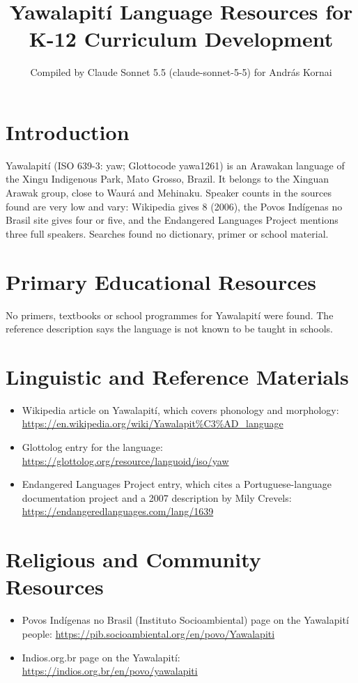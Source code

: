\documentclass[12pt]{article}
\title{Yawalapit\'i Language Resources for K-12 Curriculum Development}
\author{Compiled by Claude Sonnet 5.5 (claude-sonnet-5-5) for Andr\'as Kornai}
\date{}
\begin{document}
\maketitle

\section{Introduction}
Yawalapit\'i (ISO 639-3: yaw; Glottocode yawa1261) is an Arawakan language of the Xingu Indigenous Park, Mato Grosso, Brazil. It belongs to the Xinguan Arawak group, close to Waur\'a and Mehinaku. Speaker counts in the sources found are very low and vary: Wikipedia gives 8 (2006), the Povos Ind\'igenas no Brasil site gives four or five, and the Endangered Languages Project mentions three full speakers. Searches found no dictionary, primer or school material.

\section{Primary Educational Resources}
No primers, textbooks or school programmes for Yawalapit\'i were found. The reference description says the language is not known to be taught in schools.

\section{Linguistic and Reference Materials}
\begin{itemize}
\item Wikipedia article on Yawalapit\'i, which covers phonology and morphology: \url{https://en.wikipedia.org/wiki/Yawalapit%C3%AD_language}
\item Glottolog entry for the language: \url{https://glottolog.org/resource/languoid/iso/yaw}
\item Endangered Languages Project entry, which cites a Portuguese-language documentation project and a 2007 description by Mily Crevels: \url{https://endangeredlanguages.com/lang/1639}
\end{itemize}

\section{Religious and Community Resources}
\begin{itemize}
\item Povos Ind\'igenas no Brasil (Instituto Socioambiental) page on the Yawalapit\'i people: \url{https://pib.socioambiental.org/en/povo/Yawalapiti}
\item Indios.org.br page on the Yawalapit\'i: \url{https://indios.org.br/en/povo/yawalapiti}
\end{itemize}
\end{document}
